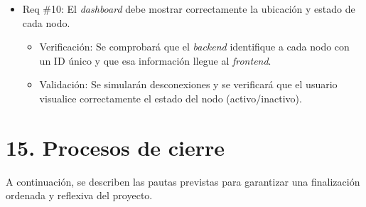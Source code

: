 \documentclass[
11pt, %
]{charter}
\begin{document}
\begin{itemize}
\item Req \#10: El \textit{dashboard} debe mostrar correctamente la ubicación y estado de cada nodo.
\begin{itemize}
	\item Verificación: Se comprobará que el \textit{backend} identifique a cada nodo con un ID único y que esa información llegue al 
    \textit{frontend}.
	\item Validación: Se simularán desconexiones y se verificará que el usuario visualice correctamente el estado del nodo 
    (activo/inactivo).
\end{itemize}

\end{itemize}


\section{15. Procesos de cierre}    
\label{sec:cierre}

A continuación, se describen las pautas previstas para garantizar una finalización ordenada y reflexiva del proyecto.
\end{document}
